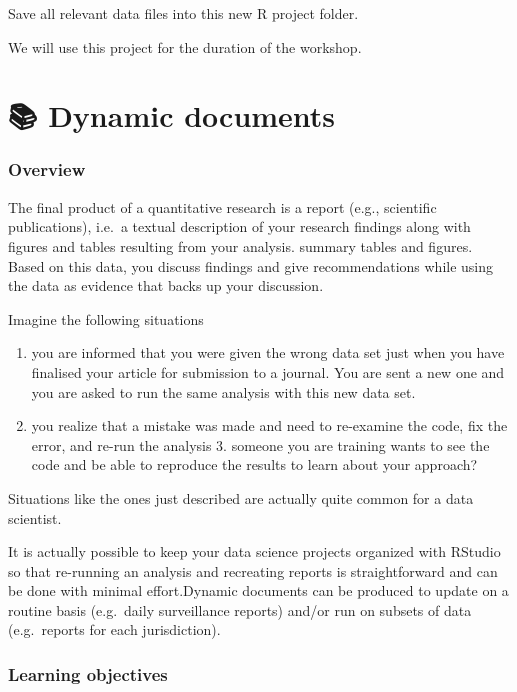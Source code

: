 \documentclass[
  letterpaper,
  DIV=11,
  numbers=noendperiod,
  oneside]{scrreprt}
\providecommand{\tightlist}{%
  \setlength{\itemsep}{0pt}\setlength{\parskip}{0pt}}\usepackage{longtable,booktabs,array}
\begin{document}
Save all relevant data files into this new R project folder.

We will use this project for the duration of the workshop.

\hypertarget{dynamic-documents}{%
\chapter{\texorpdfstring{{📚} Dynamic
documents}{📚 Dynamic documents}}\label{dynamic-documents}}

\hypertarget{overview-3}{%
\subsection{Overview}\label{overview-3}}

The final product of a quantitative research is a report (e.g.,
scientific publications), i.e.~a textual description of your research
findings along with figures and tables resulting from your analysis.
summary tables and figures. Based on this data, you discuss findings and
give recommendations while using the data as evidence that backs up your
discussion.

Imagine the following situations

\begin{enumerate}
\def\labelenumi{\arabic{enumi}.}
\tightlist
\item
  you are informed that you were given the wrong data set just when you
  have finalised your article for submission to a journal. You are sent
  a new one and you are asked to run the same analysis with this new
  data set.
\item
  you realize that a mistake was made and need to re-examine the code,
  fix the error, and re-run the analysis 3. someone you are training
  wants to see the code and be able to reproduce the results to learn
  about your approach?
\end{enumerate}

Situations like the ones just described are actually quite common for a
data scientist.

It is actually possible to keep your data science projects organized
with RStudio so that re-running an analysis and recreating reports is
straightforward and can be done with minimal effort.Dynamic documents
can be produced to update on a routine basis (e.g.~daily surveillance
reports) and/or run on subsets of data (e.g.~reports for each
jurisdiction).

\hypertarget{learning-objectives-3}{%
\subsection{Learning objectives}\label{learning-objectives-3}}
\end{document}

